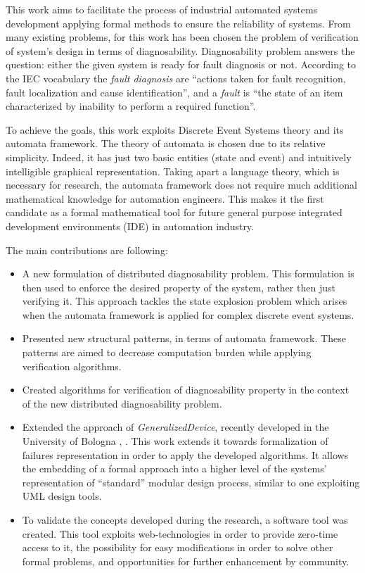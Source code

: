 This work aims to facilitate the process of industrial automated systems
development applying formal methods to ensure the reliability of systems. From
many existing problems, for this work has been chosen the problem of
verification of system's design in terms of diagnosability. Diagnosability
problem answers the question: either the given system is ready for fault
diagnosis or not. According to the IEC vocabulary \cite{iec_vocabulary} the
\emph{fault diagnosis} are ``actions taken for fault recognition, fault
localization and cause identification'', and a \emph{fault} is ``the state of an
item characterized by inability to perform a required function''.

To achieve the goals, this work exploits Discrete Event Systems theory
\cite{cassandras_introduction_2010} and its automata framework. The theory of
automata is chosen due to its relative simplicity. Indeed, it has just two basic
entities (state and event) and intuitively intelligible graphical
representation. Taking apart a language theory, which is necessary for
research, the automata framework does not require much additional
mathematical knowledge for automation engineers. This makes it the first
candidate as a formal mathematical tool for future general purpose integrated
development environments (IDE) in automation industry.

The main contributions are following:
\begin{itemize}
  \item A new formulation of distributed diagnosability problem. This 
  formulation is then used to enforce the desired property of the system,
  rather then just verifying it. This approach tackles the state explosion problem
  which arises when the automata framework is applied for complex discrete event
  systems.
  \item Presented new structural patterns, in terms of automata
  framework. These patterns are aimed to decrease computation burden while
  applying verification algorithms.
  \item Created algorithms for verification of diagnosability property in the
  context of the new distributed diagnosability problem.
  \item Extended the approach of \emph{GeneralizedDevice}, recently
  developed in the University of Bologna \cite{faldella_hierarchical_2008},
  \cite{sartini_architectures_2010}. This work extends it towards formalization
  of failures representation in order to apply the developed algorithms. It
  allows the embedding of a formal approach into a higher level of the
  systems' representation of ``standard'' modular design process, similar to one
  exploiting UML design tools.
  \item To validate the concepts developed during the research, a software tool
  was created. This tool exploits web-technologies in order to provide zero-time
  access to it, the possibility for easy modifications in order to solve other
  formal problems, and opportunities for further enhancement by community.
\end{itemize}


